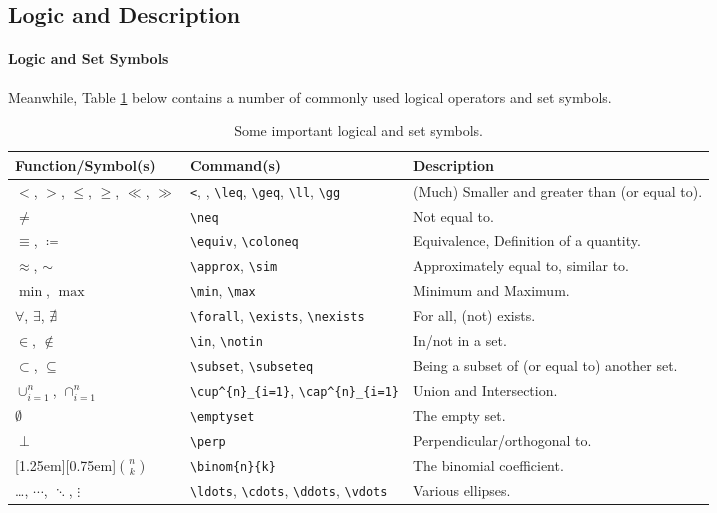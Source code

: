 \subsection{Logic and Description}

\paragraph{Logic and Set Symbols}
Meanwhile, Table \ref{tab:logicsetsymbol} below contains a number of commonly used logical operators and set symbols.

\begin{table}[ht!]
\begin{tabularx}{\textwidth}{|p{}|>{\raggedright}p{}|X|}
\hline
Function/Symbol(s) & Command(s) & Description \\
\hline
$<$, $>$, $\leq$, $\geq$, $\ll$, $\gg$ & \texttt{<}, \text{>}, \texttt{\textbackslash leq}, \texttt{\textbackslash geq}, \texttt{\textbackslash ll}, \texttt{\textbackslash gg} & (Much) Smaller and greater than (or equal to). \\
\hline
$\neq$ & \texttt{\textbackslash neq} & Not equal to. \\
\hline
$\equiv$, $\coloneq$ & \texttt{\textbackslash equiv}, \texttt{\textbackslash coloneq} & Equivalence, Definition of a quantity. \\
\hline
$\approx$, $\sim$ & \texttt{\textbackslash approx}, \texttt{\textbackslash sim} & Approximately equal to, similar to. \\
\hline
$\min$, $\max$ & \texttt{\textbackslash min}, \texttt{\textbackslash max} & Minimum and Maximum. \\
\hline
$\forall$, $\exists$, $\nexists$ & \texttt{\textbackslash forall}, \texttt{\textbackslash exists}, \texttt{\textbackslash nexists} & For all, (not) exists. \\
\hline
$\in$, $\notin$ & \texttt{\textbackslash in}, \texttt{\textbackslash notin} & In/not in a set. \\
\hline 
$\subset$, $\subseteq$ & \texttt{\textbackslash subset}, \texttt{\textbackslash subseteq} & Being a subset of (or equal to) another set.\\
\hline
$\cup^{n}_{i=1}$, $\cap^{n}_{i=1}$ & \texttt{\textbackslash cup\^{}\{n\}\_\{i=1\}}, \texttt{\textbackslash cap\^{}\{n\}\_\{i=1\}} & Union and Intersection. \\
\hline
$\emptyset$ & \texttt{\textbackslash emptyset} & The empty set. \\
\hline
$\perp$ & \texttt{\textbackslash perp} & Perpendicular/orthogonal to. \\
\hline
\raisebox{0pt}[1.25em][0.75em]{$\binom{n}{k}$} & \texttt{\textbackslash binom\{n\}\{k\}} & The binomial coefficient. \\
\hline
\ldots, $\cdots$, $\ddots$, $\vdots$ & \texttt{\textbackslash ldots}, \texttt{\textbackslash cdots}, \texttt{\textbackslash ddots}, \texttt{\textbackslash vdots} & Various ellipses. \\
\hline
\end{tabularx}
\caption{Some important logical and set symbols.}
\label{tab:logicsetsymbol}
\end{table}


